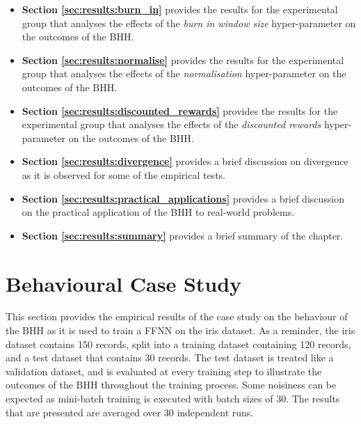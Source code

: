 \begin{itemize}
	\item \textbf{Section \ref{sec:results:burn_in}} provides the results for the experimental group that analyses the effects of the \textit{burn in window size} hyper-parameter on the outcomes of the \acs{BHH}.

	\item \textbf{Section \ref{sec:results:normalise}} provides the results for the experimental group that analyses the effects of the \textit{normalisation} hyper-parameter on the outcomes of the \acs{BHH}.

	\item \textbf{Section \ref{sec:results:discounted_rewards}} provides the results for the experimental group that analyses the effects of the \textit{discounted rewards} hyper-parameter on the outcomes of the \acs{BHH}.

	\item \textbf{Section \ref{sec:results:divergence}} provides a brief discussion on divergence as it is observed for some of the empirical tests.

	\item \textbf{Section \ref{sec:results:practical_applications}} provides a brief discussion on the practical application of the \acs{BHH} to real-world problems.

	\item \textbf{Section \ref{sec:results:summary}} provides a brief summary of the chapter.
\end{itemize}

\section{Behavioural Case Study}\label{sec:results:case_study}

This section provides the empirical results of the case study on the behaviour of the \acs{BHH} as it is used to train a \acs{FFNN} on the iris dataset. As a reminder, the iris dataset contains 150 records, split into a training dataset containing 120 records, and a test dataset that contains 30 records. The test dataset is treated like a validation dataset, and is evaluated at every training step to illustrate the outcomes of the \acs{BHH} throughout the training process. Some noisiness can be expected as mini-batch training is executed with batch sizes of 30. The results that are presented are averaged over 30 independent runs.

